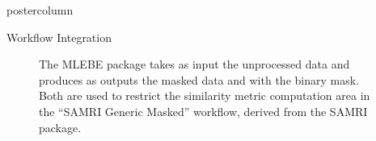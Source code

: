 \begin{frame}
\begin{columns}
\begin{column}{.42\textwidth}
\begin{beamercolorbox}[center]{postercolumn}
\begin{minipage}{.98\textwidth}
{\begin{myblock}{Workflow Integration}
                                \vspace{-0.8em}

                                \begin{figure}
                                    \centering
                                    \caption{
                                        The \textcolor{lg}{MLEBE} package takes as input the unprocessed data and produces as outputs the masked data and with the binary mask.
                                        Both are used to restrict the similarity metric computation area in the “SAMRI Generic Masked” workflow, derived from the \textcolor{lg}{SAMRI} \cite{irsabi} package.
                                    }
                                \end{figure}
                            \end{myblock}\vfill

}
\end{minipage}
\end{beamercolorbox}
\end{column}
\end{columns}
\end{frame}
